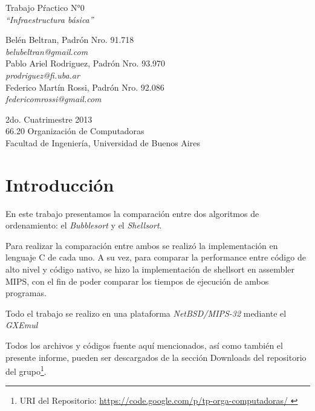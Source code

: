 \documentclass{article}
\begin{document}
\setcounter{page}{5}

\begin{titlepage}
	\vspace*{\fill}
	\begin{center}
		\huge{Trabajo Pŕactico N°0} \\
		\medskip
		\Huge \textit{``Infraestructura básica''} \\
		
		\bigskip\bigskip\bigskip\bigskip\bigskip

		\Large Belén Beltran, Padrón Nro. 91.718 \\
		\large \textit{belubeltran@gmail.com} \\ \medskip
		\Large Pablo Ariel Rodriguez, Padrón Nro. 93.970 \\
		\large \textit{prodriguez@fi.uba.ar} \\ \medskip
		\Large Federico Martín Rossi, Padrón Nro. 92.086 \\
		\large \textit{federicomrossi@gmail.com} \\

		\bigskip\bigskip\bigskip\bigskip\bigskip\bigskip\bigskip

		\large 2do. Cuatrimestre 2013 \\ \smallskip
		\large 66.20 Organización de Computadoras \\ \smallskip
		\large Facultad de Ingeniería, Universidad de Buenos Aires \\ \smallskip

		\date{}
	\end{center}
	\vspace*{\fill}
\end{titlepage}

\newpage
\newpage \textit{}
\newpage



\tableofcontents
\newpage \textit{}
\newpage
{}




\section{Introducción}
	
	En este trabajo presentamos la comparación entre dos algoritmos de ordenamiento:  el \textit{Bubblesort} y el \textit{Shellsort}.
	\par
	Para realizar la comparación entre ambos se realizó la implementación en lenguaje C de cada uno. A su vez, para comparar la performance entre código de alto nivel y código nativo, se hizo la implementación de shellsort en assembler MIPS, con el fin de poder comparar los tiempos de ejecución de ambos programas.
	\par
	Todo el trabajo se realizo en una plataforma \textit{NetBSD/MIPS-32} mediante el \textit{GXEmul} \cite{GXEMUL}
	\par
	Todos los archivos y códigos fuente aquí mencionados, así como también el presente informe, pueden ser
descargados de la sección Downloads del repositorio del grupo\footnote{URI del Repositorio: \url{https://code.google.com/p/tp-orga-computadoras/ }}.
\bigskip
\end{document}
